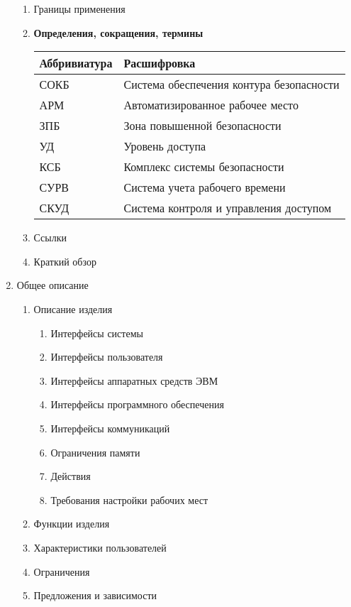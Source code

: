 \documentclass[12pt]{article} %
\begin{document}
\begin{enumerate}
\begin{enumerate}
        \item Границы применения
        \item \begin{large} \textbf{Определения, сокращения, термины} \end{large} \newline
          \begin{tabular}{ | l | l |}
            \hline
            Аббривиатура & Расшифровка \\ \hline
            СОКБ & Система обеспечения контура безопасности \\
            АРМ & Автоматизированное рабочее место \\
            ЗПБ & Зона повышенной безопасности \\
            УД & Уровень доступа \\
            КСБ & Комплекс системы безопасности \\
            СУРВ & Система учета рабочего времени \\
            СКУД & Система контроля и управления доступом \\
            \hline
          \end{tabular}
        \item Ссылки
        \item Краткий обзор
    \end{enumerate} 
  \item  Общее описание
  	\begin{enumerate}
  		\item Описание изделия
  			\begin{enumerate}
  				\item Интерфейсы системы
  				\item Интерфейсы пользователя
  				\item Интерфейсы аппаратных средств ЭВМ
  				\item Интерфейсы программного обеспечения
  				\item Интерфейсы коммуникаций
  				\item Ограничения памяти
  				\item Действия
  				\item Требования настройки рабочих мест
  			\end{enumerate}
  		\item Функции изделия
  		\item Характеристики пользователей
  		\item Ограничения
  		\item Предложения и зависимости

\end{enumerate}
\end{enumerate}
\end{document}
